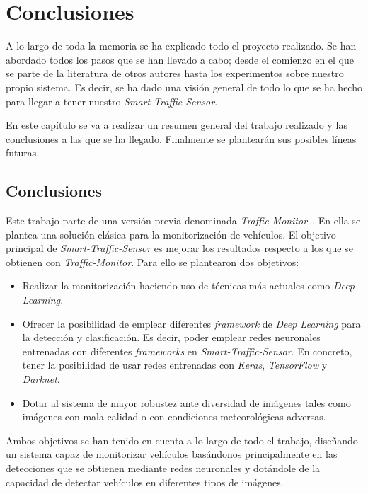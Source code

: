 \chapter{Conclusiones}\label{cap.conclusiones}

A lo largo de toda la memoria se ha explicado todo el proyecto realizado. Se han abordado todos los pasos que se han llevado a cabo; desde el comienzo en el que se parte de la literatura de otros autores hasta los experimentos sobre nuestro propio sistema. Es decir, se ha dado una visión general de todo lo que se ha hecho para llegar a tener nuestro \textit{Smart-Traffic-Sensor}.

En este capítulo se va a realizar un resumen general del trabajo realizado y las conclusiones a las que se ha llegado. Finalmente se plantearán sus posibles líneas futuras.

\section{Conclusiones}

Este trabajo parte de una versión previa denominada \textit{Traffic-Monitor}~\cite{traffic_monitor_redo}. En ella se plantea una solución clásica para la monitorización de vehículos. El objetivo principal de \textit{Smart-Traffic-Sensor} es mejorar los resultados respecto a los que se obtienen con \textit{Traffic-Monitor}. Para ello se plantearon dos  objetivos:
\begin{itemize}
    \item Realizar la monitorización haciendo uso de técnicas más actuales como \textit{Deep Learning}.
    \item Ofrecer la posibilidad de emplear diferentes \textit{framework} de \textit{Deep Learning} para la detección y clasificación. Es decir, poder emplear redes neuronales entrenadas con diferentes \textit{frameworks} en  \textit{Smart-Traffic-Sensor}. En concreto, tener la posibilidad de usar redes entrenadas con \textit{Keras}, \textit{TensorFlow} y \textit{Darknet}.
    \item Dotar al sistema de mayor robustez ante diversidad de imágenes tales como imágenes con mala calidad o con condiciones meteorológicas adversas.
\end{itemize}

Ambos objetivos se han tenido en cuenta a lo largo de todo el trabajo, diseñando un sistema capaz de monitorizar vehículos basándonos principalmente en las detecciones que se obtienen mediante redes neuronales y dotándole de la capacidad de detectar vehículos en diferentes tipos de imágenes.

